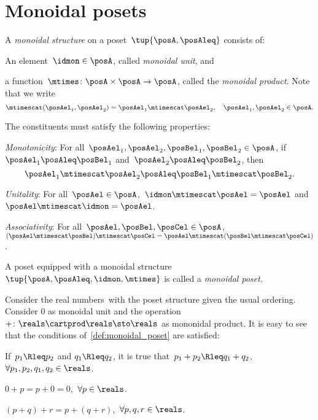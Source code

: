 

\section{Monoidal posets}\label{sec:parallelism-monoidal-posets}

\begin{definition}
  \label{def:monoidal_poset}
  A \emph{monoidal structure} on a poset~$\tup{\posA,\posAleq}$ consists of:
  \begin{compactenum}
    \item An element~$\idmon\in \posA$, called \emph{monoidal unit}, and
    \item a function~$\mtimes\colon \posA\times \posA\to \posA$, called the \emph{monoidal product}. Note that we write
    \begin{equation*}
      \mtimescat(\posAel_1,\posAel_2)=\posAel_1\mtimescat \posAel_2, \quad \posAel_1,\posAel_2\in \posA.
    \end{equation*}
  \end{compactenum}
  The constituents must satisfy the following properties:
  \begin{compactenum}[(a)]
    \item \emph{Monotonicity}: For all~$\posAel_1,\posAel_2,\posBel_1,\posBel_2\in \posA$, if~$\posAel_1\posAleq \posBel_1$ and~$\posAel_2\posAleq \posBel_2$, then
    \begin{equation*}
      \posAel_1\mtimescat \posAel_2\posAleq \posBel_1\mtimescat \posBel_2.
    \end{equation*}
    \item \emph{Unitality}: For all~$\posAel\in \posA$,~$\idmon\mtimescat \posAel=\posAel$ and~$\posAel\mtimescat \idmon=\posAel$.
    \item \emph{Associativity}: For all~$\posAel,\posBel,\posCel\in \posA $,~$(\posAel\mtimescat \posBel)\mtimescat \posCel=\posAel\mtimescat (\posBel\mtimescat \posCel)$.
  \end{compactenum}
  A poset equipped with a monoidal structure $\tup{\posA,\posAleq,\idmon,\mtimes}$ is called a \emph{monoidal poset}.
\end{definition}

\begin{example}
  \label{ex:monoidal_pos_reals}
  Consider the real numbers~\reals with the poset structure given the usual ordering.
  Consider 0 as monoidal unit and the operation~$+\colon \reals\cartprod \reals\sto \reals$ as mononidal product.
  It is easy to see that the conditions of~\cref{def:monoidal_poset} are satisfied:
  \begin{compactenum}[(a)]
    \item If~$p_1\Rleq  p_2$ and $q_1\Rleq  q_2$, it is true that~$p_1+p_2\Rleq  q_1+q_2$,~$\forall p_1,p_2,q_1,q_2\in \reals$.
    \item $0+p=p+0=0$,~$\forall p\in \reals$.
    \item $(p+q)+r=p+(q+r)$,~$\forall p,q,r\in \reals$.
  \end{compactenum}
\end{example}

